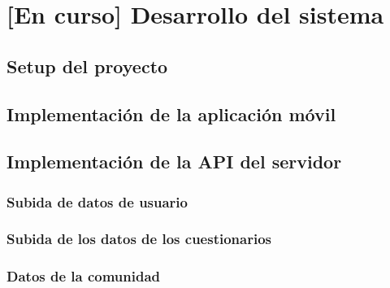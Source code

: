 \chapter{[En curso] Desarrollo del sistema}
    \label{chapter:desarrollo}

    
    \section{Setup del proyecto}

    \section{Implementación de la aplicación móvil}

    \section{Implementación de la API del servidor}

        \subsection{Subida de datos de usuario}

        \subsection{Subida de los datos de los cuestionarios}

        \subsection{Datos de la comunidad}
